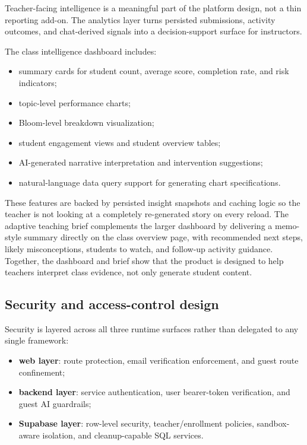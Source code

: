 \documentclass[11pt,a4paper]{article}
\begin{document}
Teacher-facing intelligence is a meaningful part of the platform design, not a thin reporting add-on.
The analytics layer turns persisted submissions, activity outcomes, and chat-derived signals into a
decision-support surface for instructors.

The class intelligence dashboard includes:
\begin{itemize}
  \item summary cards for student count, average score, completion rate, and risk indicators;
  \item topic-level performance charts;
  \item Bloom-level breakdown visualization;
  \item student engagement views and student overview tables;
  \item AI-generated narrative interpretation and intervention suggestions;
  \item natural-language data query support for generating chart specifications.
\end{itemize}

These features are backed by persisted insight snapshots and caching logic so the teacher is not
looking at a completely re-generated story on every reload. The adaptive teaching brief complements
the larger dashboard by delivering a memo-style summary directly on the class overview page, with
recommended next steps, likely misconceptions, students to watch, and follow-up activity guidance.
Together, the dashboard and brief show that the product is designed to help teachers interpret class
evidence, not only generate student content.

\subsection{Security and access-control design}

Security is layered across all three runtime surfaces rather than delegated to any single framework:
\begin{itemize}
  \item \textbf{web layer}: route protection, email verification enforcement, and guest route confinement;
  \item \textbf{backend layer}: service authentication, user bearer-token verification, and guest AI guardrails;
  \item \textbf{Supabase layer}: row-level security, teacher/enrollment policies, sandbox-aware isolation, and cleanup-capable SQL services.
\end{itemize}
\end{document}
